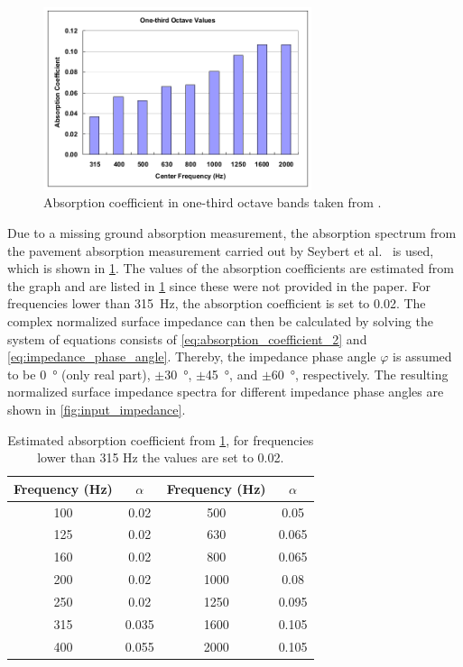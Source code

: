 {\begin{figure}[H]
	\centering
	\includegraphics[width=0.7\textwidth]{fig/chap4/impedance/absorption_spectrum.png}
	\caption{Absorption coefficient in one-third octave bands taken from \cite{Seybert2008MeasurementOP}.}
	\label{fig:ground_absorption}
\end{figure}

Due to a missing ground absorption measurement, the absorption spectrum from the pavement absorption measurement carried out by Seybert et al.\ \cite{Seybert2008MeasurementOP} is used, which is shown in \cref{fig:ground_absorption}.
The values of the absorption coefficients are estimated from the graph and are listed in \cref{tab:absorption_coefficient} since these were not provided in the paper. For frequencies lower than \SI{315}{\hertz}, the absorption coefficient is set to 0.02. The complex normalized surface impedance can then be calculated by solving the system of equations consists of \cref{eq:absorption_coefficient_2} and \cref{eq:impedance_phase_angle}. Thereby, the impedance phase angle $\varphi$ is assumed to be \SI{0}{\degree} (only real part), $\pm$\SI{30}{\degree}, $\pm$\SI{45}{\degree}, and $\pm$\SI{60}{\degree}, respectively. The resulting normalized surface impedance spectra for different impedance phase angles are shown in \cref{fig:input_impedance}.

\begin{table}[H]
	\centering
	\caption{Estimated absorption coefficient from \cref{fig:ground_absorption}, for frequencies lower than 315 Hz the values are set to 0.02.}
	\label{tab:absorption_coefficient}
	\begin{tabular}{cccc}
		\toprule
		Frequency (Hz) & $\alpha$ & Frequency (Hz) & $\alpha$ \\
		\midrule
		100 & 0.02 & 500 & 0.05 \\
		125 & 0.02 & 630 & 0.065 \\
		160 & 0.02 & 800 & 0.065 \\
		200 & 0.02 & 1000 & 0.08 \\
		250 & 0.02 & 1250 & 0.095 \\
		315 & 0.035 & 1600 & 0.105 \\
		400 & 0.055 & 2000 & 0.105 \\
		\bottomrule
	\end{tabular}
\end{table}

}
